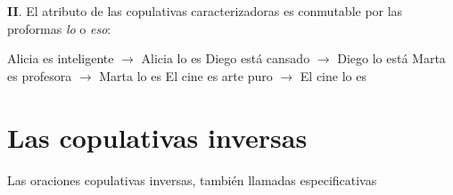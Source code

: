 \textbf{II}. El atributo de las copulativas caracterizadoras es conmutable por las proformas \textit{lo} o \textit{eso}:

\pex
\a Alicia es inteligente $\longrightarrow$ Alicia lo es
\a Diego está cansado $\longrightarrow$ Diego lo está
\a Marta es profesora $\longrightarrow$ Marta lo es
\a El cine es arte puro $\longrightarrow$ El cine lo es
\xe




\section{Las copulativas inversas}

Las oraciones copulativas inversas, también llamadas especificativas 
